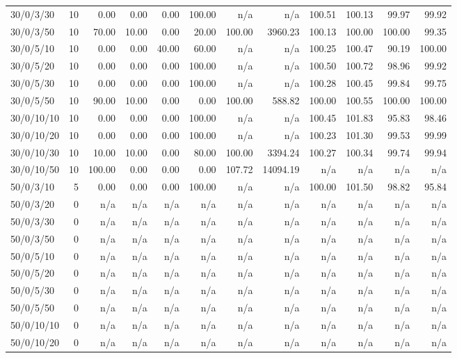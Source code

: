 \begin{table}[htbp]
{\begin{tabular}{lr*{10}{r}}
30/0/3/30 & 10 &  0.00 &  0.00 &  0.00 & 100.00 & n/a & n/a & 100.51 & 100.13 & 99.97 & 99.92 \\ 
30/0/3/50 & 10 & 70.00 & 10.00 &  0.00 & 20.00 & 100.00 & 3960.23 & 100.13 & 100.00 & 100.00 & 99.35 \\ 
30/0/5/10 & 10 &  0.00 &  0.00 & 40.00 & 60.00 & n/a & n/a & 100.25 & 100.47 & 90.19 & 100.00 \\ 
30/0/5/20 & 10 &  0.00 &  0.00 &  0.00 & 100.00 & n/a & n/a & 100.50 & 100.72 & 98.96 & 99.92 \\ 
30/0/5/30 & 10 &  0.00 &  0.00 &  0.00 & 100.00 & n/a & n/a & 100.28 & 100.45 & 99.84 & 99.75 \\ 
30/0/5/50 & 10 & 90.00 & 10.00 &  0.00 &  0.00 & 100.00 & 588.82 & 100.00 & 100.55 & 100.00 & 100.00 \\ 
30/0/10/10 & 10 &  0.00 &  0.00 &  0.00 & 100.00 & n/a & n/a & 100.45 & 101.83 & 95.83 & 98.46 \\ 
30/0/10/20 & 10 &  0.00 &  0.00 &  0.00 & 100.00 & n/a & n/a & 100.23 & 101.30 & 99.53 & 99.99 \\ 
30/0/10/30 & 10 & 10.00 & 10.00 &  0.00 & 80.00 & 100.00 & 3394.24 & 100.27 & 100.34 & 99.74 & 99.94 \\ 
30/0/10/50 & 10 & 100.00 &  0.00 &  0.00 &  0.00 & 107.72 & 14094.19 & n/a & n/a & n/a & n/a \\ 
50/0/3/10 & 5 &  0.00 &  0.00 &  0.00 & 100.00 & n/a & n/a & 100.00 & 101.50 & 98.82 & 95.84 \\ 
50/0/3/20 & 0 & n/a & n/a & n/a & n/a & n/a & n/a & n/a & n/a & n/a & n/a \\ 
50/0/3/30 & 0 & n/a & n/a & n/a & n/a & n/a & n/a & n/a & n/a & n/a & n/a \\ 
50/0/3/50 & 0 & n/a & n/a & n/a & n/a & n/a & n/a & n/a & n/a & n/a & n/a \\ 
50/0/5/10 & 0 & n/a & n/a & n/a & n/a & n/a & n/a & n/a & n/a & n/a & n/a \\ 
50/0/5/20 & 0 & n/a & n/a & n/a & n/a & n/a & n/a & n/a & n/a & n/a & n/a \\ 
50/0/5/30 & 0 & n/a & n/a & n/a & n/a & n/a & n/a & n/a & n/a & n/a & n/a \\ 
50/0/5/50 & 0 & n/a & n/a & n/a & n/a & n/a & n/a & n/a & n/a & n/a & n/a \\ 
50/0/10/10 & 0 & n/a & n/a & n/a & n/a & n/a & n/a & n/a & n/a & n/a & n/a \\ 
50/0/10/20 & 0 & n/a & n/a & n/a & n/a & n/a & n/a & n/a & n/a & n/a & n/a \\ 

\end{tabular}}
\end{table}
